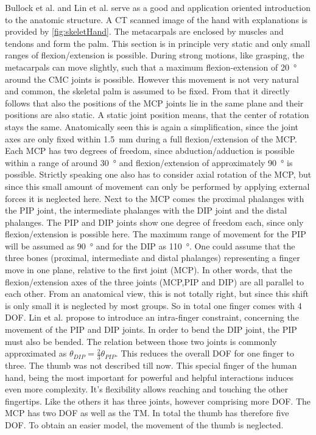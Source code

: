 Bullock et al. \cite{bullock2012assessing} and Lin et al. \cite{lin2000modeling} serve as a good and application oriented introduction to the anatomic structure. A CT scanned image of the hand with explanations is provided by \ref{fig:skeletHand}. The metacarpals are enclosed by muscles and tendons and form the palm. This section is in principle very static and only small ranges of flexion/extension is possible. During strong motions, like grasping, the metacarpals can move slightly, such that a maximum flexion-extension of \SI{20}{\degree} around the \ac{CMC} joints is possible. However this movement is not very natural and common, the skeletal palm is assumed to be fixed. From that it directly follows that also the positions of the \ac{MCP} joints lie in the same plane and their positions are also static. A static joint position means, that the center of rotation stays the same. Anatomically seen this is again a simplification, since the joint axes are only fixed within \SI{1.5}{mm} during a full flexion/extension of the \ac{MCP}. Each \ac{MCP} has two degrees of freedom, since abduction/adduction is possible within a range of around \SI{30}{\degree} and flexion/extension of approximately \SI{90}{\degree} is possible. Strictly speaking one also has to consider axial rotation of the MCP, but since this small amount of movement can only be performed by applying external forces it is neglected here. Next to the MCP comes the proximal phalanges with the \ac{PIP} joint, the intermediate phalanges with the \ac{DIP} joint and the distal phalanges. The \ac{PIP} and \ac{DIP} joints show one degree of freedom each, since only flexion/extension is possible here. The maximum range of movement for the \ac{PIP} will be assumed as \SI{90}{\degree} and for the \ac{DIP} as \SI{110}{\degree}. One could assume that the three bones (proximal, intermediate and distal phalanges) representing a finger move in one plane, relative to the first joint (\ac{MCP}). In other words, that the flexion/extension axes of the three joints (\ac{MCP},\ac{PIP} and \ac{DIP}) are all parallel to each other. From an anatomical view, this is not totally right, but since this shift is only small it is neglected by most groups. So in total one finger comes with 4 \ac{DOF}. Lin et al. propose to introduce an intra-finger constraint, concerning the movement of the \ac{PIP} and \ac{DIP} joints. In order to bend the \ac{DIP} joint, the \ac{PIP} must also be bended. The relation between those two joints is commonly approximated as $ \theta_{DIP} = \frac{2}{3} \theta_{PIP} $. This reduces the overall \ac{DOF} for one finger to three. The thumb was not described till now. This special finger of the human hand, being the most important for powerful and helpful interactions induces even more complexity. It's flexibility allows reaching and touching the other fingertips. Like the others it has three joints, however comprising more \ac{DOF}. The \ac{MCP} has two \ac{DOF} as well as the \acs{TM}. In total the thumb has therefore five \ac{DOF}. To obtain an easier model, the movement of the thumb is neglected.


